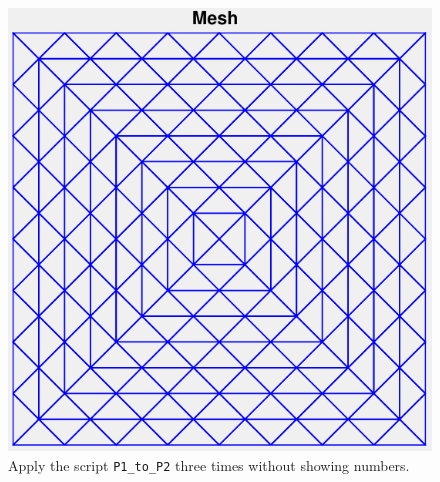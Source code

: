 \documentclass[11pt,a4paper,center,notitlepage]{article}
\numberwithin{equation}{section}
\begin{document}
\begin{figure}[H]
\centering
\includegraphics[scale=0.6]{4}
\caption{Apply the script \texttt{P1\_to\_P2} three times without showing numbers.}
\label{fig4}
\end{figure}
\end{document}
